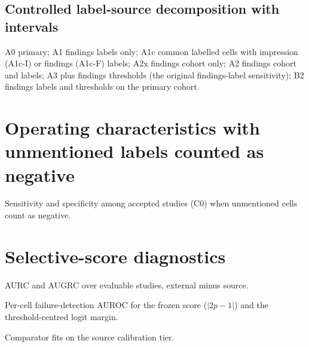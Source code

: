 \documentclass[10pt,a4paper]{article}
\begin{document}
\begin{landscape}
\section{Controlled label-source decomposition with intervals}\label{ssec:ls}
A0 primary; A1 findings labels only; A1c common labelled cells with impression
(A1c-I) or findings (A1c-F) labels; A2x findings cohort only; A2 findings cohort
and labels; A3 plus findings thresholds (the original findings-label sensitivity);
B2 findings labels and thresholds on the primary cohort.
\footnotesize

\normalsize
\end{landscape}

\section{Operating characteristics with unmentioned labels counted as negative}
\begin{table}[h]\centering\small
\caption{Sensitivity and specificity among accepted studies (C0) when
unmentioned cells count as negative.}\label{stab:ocunm}

\end{table}

\section{Selective-score diagnostics}\label{ssec:selective}
\begin{table}[h]\centering\small
\caption{AURC and AUGRC over evaluable studies, external minus source.}\label{stab:tf}
\begin{adjustbox}{max width=\linewidth}\end{adjustbox}
\end{table}
\begin{table}[h]\centering\small
\caption{Per-cell failure-detection AUROC for the frozen score ($|2p-1|$) and the
threshold-centred logit margin.}\label{stab:cells}
\begin{adjustbox}{max width=\linewidth}\end{adjustbox}
\end{table}
\begin{table}[h]\centering\small
\caption{Comparator fits on the source calibration tier.}\label{stab:fits}
\begin{adjustbox}{max width=\linewidth}\end{adjustbox}
\end{table}
\end{document}
